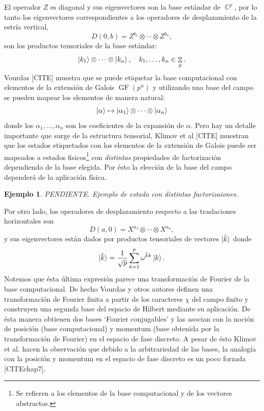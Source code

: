 \documentclass[a4paper]{report}
\DeclareMathOperator{\C}{\mathbb{C}}
\DeclareMathOperator{\Z}{\mathbb{Z}}
\DeclareMathOperator{\GF}{GF}
\newtheorem{example}{Ejemplo}
\begin{document}
  El operador $Z$ es diagonal y sus eigenvectores son la
  base estándar de $\C^{p}$, por lo tanto los eigenvectores
  correspondientes a los operadores de desplazamiento de la
  estría vertical, 
  \[
    D(0,b) = Z^{b_1} \otimes \cdots \otimes Z^{b_n},
  \] 
  son los productos tensoriales de la base estándar:
  \[
    \ket{k_1} \otimes \cdots \otimes \ket{k_n},
    \quad k_1,\ldots,k_n \in \Z_p.
  \] 
  Vourdas [CITE] muestra que se puede etiquetar la base
  computacional con elementos de la extensión de Galois
  $\GF\left(p^{n}\right)$ y utilizando una base del campo se
  pueden mapear los elementos de manera natural:
  \[
    \ket \alpha
    \mapsto \ket{\alpha_1} \otimes \cdots \otimes
    \ket{\alpha_n}
  \] 
  donde los $\alpha_1,\ldots,\alpha_n$ son los coeficientes
  de la expansión de $\alpha$. Pero hay un detalle
  importante que surge de la estructura tensorial, Klimov et
  al [CITE] muestran que los estados etiquetados con los
  elementos de la extensión de Galois puede ser mapeados a
  estados fisicos\footnote{Se refieren a los elementos de la
  base computacional y de los vectores abstractos.} con
  \textit{distintas} propiedades de factorización
  dependiendo de la base elegida. Por ésto la elección de la
  base del campo dependerá de la aplicación física.
  \begin{example}
    PENDIENTE. Ejemplo de estado con distintas factorizaiones.
  \end{example}
  Por otro lado, los operadores de desplazamiento respecto a
  las traslaciones horizontales son
  \[
    D(a,0) = X^{a_1} \otimes \cdots \otimes X^{a_n},
  \] 
  y sus eigenvectores están dados por productos tensoriales
  de vectores $\ket{\tilde k}$ donde
  \[
    \ket{\tilde k}
    = \frac{1}{\sqrt{p}} \sum_{k=1}^{p}
    \omega^{\tilde k k} \ket k.
  \] 
  Notemos que ésta última expresión parece una
  transformación de Fourier de la base computacional. De
  hecho Vourdas y otros autores definen una transformación
  de Fourier finita a partir de los caracteres $\chi$ del
  campo finito y construyen una segunda base del espacio de
  Hilbert mediante su aplicación. De ésta manera obtienen
  dos bases `Fourier conjugables' y las asocian con la
  noción de posición (base computacional) y momentum (base
  obtenida por la transformación de Fourier) en el espacio
  de fase discreto. A pesar de ésto Klimov et al. hacen la
  observación que debido a la arbitrariedad de las bases, la
  analogía con la posición y momentum en el espacio de fase
  discreto es un poco forzada [CITEchap7].
\end{document}

